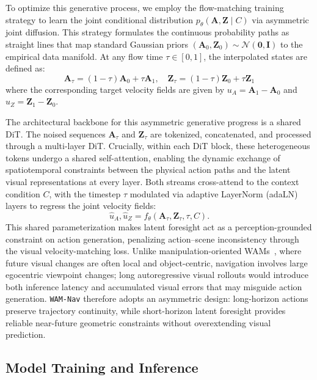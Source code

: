 \documentclass{article}
\begin{document}
To optimize this generative process, we employ the flow-matching \citep{streamingflow2025} training strategy to learn the joint conditional distribution $p_\theta(\mathbf{A}, \mathbf{Z} \mid C)$ via asymmetric joint diffusion. This strategy formulates the continuous probability paths as straight lines that map standard Gaussian priors $(\mathbf{A}_0, \mathbf{Z}_0) \sim \mathcal{N}(\mathbf{0}, \mathbf{I})$ to the empirical data manifold. At any flow time $\tau \in [0, 1]$, the interpolated states are defined as:
\begin{equation}
    \mathbf{A}_{\tau} = (1-\tau)\mathbf{A}_0 + \tau \mathbf{A}_1, \quad
    \mathbf{Z}_{\tau} = (1-\tau)\mathbf{Z}_0 + \tau \mathbf{Z}_1
\end{equation}
where the corresponding target velocity fields are given by $u_A = \mathbf{A}_1 - \mathbf{A}_0$ and $u_Z = \mathbf{Z}_1 - \mathbf{Z}_0$.

The architectural backbone for this asymmetric generative progress is a shared DiT. The noised sequences $\mathbf{A}_{\tau}$ and $\mathbf{Z}_{\tau}$ are tokenized, concatenated, and processed through a multi-layer DiT. Crucially, within each DiT block, these heterogeneous tokens undergo a shared self-attention, enabling the dynamic exchange of spatiotemporal constraints between the physical action paths and the latent visual representations at every layer. Both streams cross-attend to the context condition $C$, with the timestep $\tau$ modulated via adaptive LayerNorm (adaLN) layers to regress the joint velocity fields:
\begin{equation}
    \hat{u}_A, \hat{u}_Z = f_{\theta}(\mathbf{A}_{\tau}, \mathbf{Z}_{\tau}, \tau, C).
\end{equation}
This shared parameterization makes latent foresight act as a perception-grounded constraint on action generation, penalizing action--scene inconsistency through the visual velocity-matching loss. Unlike manipulation-oriented WAMs~\citep{ye2026dreamzero, bi2025motus}, where future visual changes are often local and object-centric, navigation involves large egocentric viewpoint changes; long autoregressive visual rollouts would introduce both inference latency and accumulated visual errors that may misguide action generation. \texttt{WAM-Nav} therefore adopts an asymmetric design: long-horizon actions preserve trajectory continuity, while short-horizon latent foresight provides reliable near-future geometric constraints without overextending visual prediction.

\subsection{Model Training and Inference}
\end{document}
